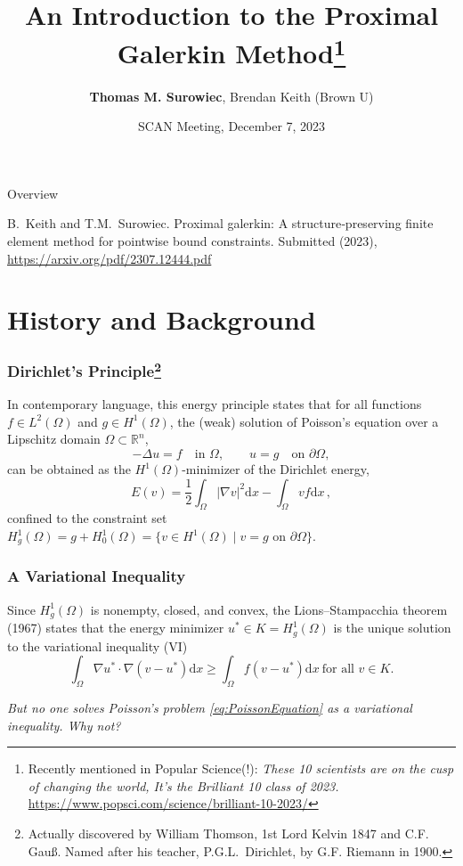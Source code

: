 \documentclass[aspectratio=169,xcolor=dvipsnames,11pt]{beamer}
\title[Proximal Galerkin]{An Introduction to the Proximal Galerkin Method\footnote{\tiny Recently mentioned in Popular Science(!): \textit{These 10 scientists are on the cusp of changing the world,
It's the Brilliant 10 class of 2023.} \url{https://www.popsci.com/science/brilliant-10-2023/}}
 } %
\author{\small{\bf Thomas M. Surowiec}, Brendan Keith (Brown U)}
\institute[SCAN, Simula]{Department of Numerical Analysis and Scientific Computing \newline Simula Research Laboratory \newline Oslo, Norway}
\date[SCAN Meeting\\ December 7, 2023]{ {\footnotesize 
SCAN Meeting, December 7, 2023}}
\newcommand{\dd}{\mathrm{d}}
\newcommand{\fa}{\text{for all }}
\begin{document}
\frame{\titlepage}

\begin{frame}{Overview}
\tableofcontents
\begin{thebibliography}{1}

{\sc B.~Keith and T.M.~Surowiec.}
\newblock Proximal galerkin: A structure‐preserving finite element method for pointwise bound constraints.
\newblock Submitted (2023), \url{https://arxiv.org/pdf/2307.12444.pdf}
\end{thebibliography}
\end{frame}

\section{History and Background}
\begin{frame}\frametitle{Dirichlet's Principle\footnote{\tiny Actually discovered by William Thomson, 1st Lord Kelvin 1847 and C.F. Gau\ss. Named after his teacher, P.G.L.\  Dirichlet, by G.F. Riemann in 1900.}}

 In contemporary language, this energy principle states that for all functions $f\in L^2(\Omega)$ and $g\in H^1(\Omega)$, the (weak) solution of Poisson's equation over a Lipschitz domain $\Omega \subset \mathbb{R}^n$,
\begin{equation}
\label{eq:PoissonEquation}
	-\Delta u = f
	\quad \text{in~} \Omega,
	\qquad
	u = g \quad \text{on~} \partial\Omega,
\end{equation}
can be obtained as the $H^1(\Omega)$-minimizer of the Dirichlet energy,
\begin{equation}
\label{eq:DirichletEnergy}
	E(v)
	=
	\frac{1}{2}
	\int_\Omega |\nabla v|^2 \dd x
	-
	\int_\Omega v f \dd x
	\,,
\end{equation}
confined to the constraint set $H^1_g(\Omega) = g + H^1_0(\Omega) = \{ v \in H^1(\Omega) \mid v = g \text{~on~} \partial \Omega\}$.

\end{frame}

\begin{frame}\frametitle{A Variational Inequality}
Since $H^1_g(\Omega)$ is nonempty, closed, and convex, the Lions--Stampacchia theorem (1967) states that the energy minimizer $u^\ast \in K = H^1_g(\Omega)$ is the unique solution to the variational inequality (VI)
\begin{equation*}
	\int_\Omega \nabla u^\ast \cdot \nabla (v - u^*)  \dd x \geq \int_\Omega f (v - u^*) \dd x
	~\fa v \in K.
\end{equation*}
\pause
\begin{center}\textit{
But no one solves Poisson's problem \eqref{eq:PoissonEquation} as a variational inequality. Why not?}
\end{center}
\end{frame}
\end{document}
